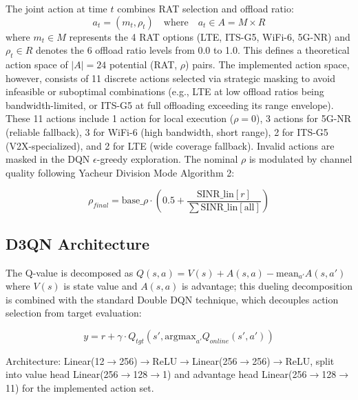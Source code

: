 \documentclass[journal,10pt,twocolumn]{IEEEtran}
\begin{document}
The joint action at time $t$ combines RAT selection and offload ratio:
\begin{equation}
\label{eq:action_space}
a_t = (m_t, \rho_t) \quad \text{where} \quad a_t \in A = M \times R
\end{equation}
where $m_t \in M$ represents the 4 RAT options (LTE, ITS-G5, WiFi-6, 5G-NR) and $\rho_t \in R$ denotes the 6 offload ratio levels from 0.0 to 1.0. This defines a theoretical action space of $|A| = 24$ potential (RAT, $\rho$) pairs. The implemented action space, however, consists of 11 discrete actions selected via strategic masking to avoid infeasible or suboptimal combinations (e.g., LTE at low offload ratios being bandwidth-limited, or ITS-G5 at full offloading exceeding its range envelope). These 11 actions include 1 action for local execution ($\rho=0$), 3 actions for 5G-NR (reliable fallback), 3 for WiFi-6 (high bandwidth, short range), 2 for ITS-G5 (V2X-specialized), and 2 for LTE (wide coverage fallback). Invalid actions are masked in the DQN $\epsilon$-greedy exploration. The nominal $\rho$ is modulated by channel quality following Yacheur Division Mode \cite{yacheur2023} Algorithm 2:

\begin{equation}
\label{eq:rho_final}
\rho_{final} = \text{base\_}\rho \cdot \left(0.5 + \frac{\text{SINR\_lin}[r]}{\sum \text{SINR\_lin}[\text{all}]}\right)
\end{equation}

\subsection{D3QN Architecture}

The Q-value is decomposed as $Q(s,a) = V(s) + A(s,a) - \text{mean}_{a'} A(s,a')$ where $V(s)$ is state value and $A(s,a)$ is advantage; this dueling decomposition is combined with the standard Double DQN technique, which decouples action selection from target evaluation:

\begin{equation}
\label{eq:ddqn}
y = r + \gamma \cdot Q_{tgt}(s', \text{argmax}_{a'} Q_{online}(s', a'))
\end{equation}

\begingroup\raggedright
Architecture: Linear(12$\rightarrow$256)$\rightarrow$\allowbreak ReLU$\rightarrow$\allowbreak Linear(256$\rightarrow$256)$\rightarrow$ReLU, split into value head Linear(256$\rightarrow$128$\rightarrow$1) and advantage head Linear(256$\rightarrow$128$\rightarrow$11) for the implemented action set.
\par\endgroup
\end{document}

